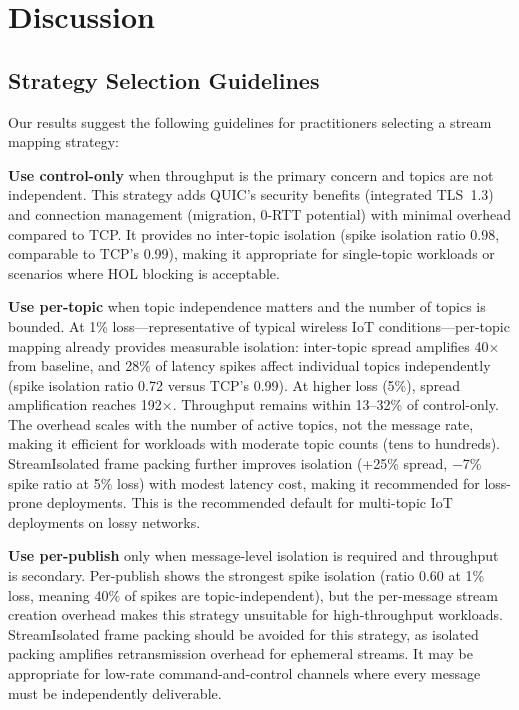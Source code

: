 \section{Discussion}
\label{sec:discussion}

\subsection{Strategy Selection Guidelines}

Our results suggest the following guidelines for practitioners selecting a stream mapping strategy:

\textbf{Use control-only} when throughput is the primary concern and topics are not independent. This strategy adds QUIC's security benefits (integrated TLS~1.3) and connection management (migration, 0-RTT potential) with minimal overhead compared to TCP. It provides no inter-topic isolation (spike isolation ratio 0.98, comparable to TCP's 0.99), making it appropriate for single-topic workloads or scenarios where HOL blocking is acceptable.

\textbf{Use per-topic} when topic independence matters and the number of topics is bounded. At 1\% loss---representative of typical wireless IoT conditions---per-topic mapping already provides measurable isolation: inter-topic spread amplifies 40$\times$ from baseline, and 28\% of latency spikes affect individual topics independently (spike isolation ratio 0.72 versus TCP's 0.99). At higher loss (5\%), spread amplification reaches 192$\times$. Throughput remains within 13--32\% of control-only. The overhead scales with the number of active topics, not the message rate, making it efficient for workloads with moderate topic counts (tens to hundreds). StreamIsolated frame packing further improves isolation (+25\% spread, $-$7\% spike ratio at 5\% loss) with modest latency cost, making it recommended for loss-prone deployments. This is the recommended default for multi-topic IoT deployments on lossy networks.

\textbf{Use per-publish} only when message-level isolation is required and throughput is secondary. Per-publish shows the strongest spike isolation (ratio 0.60 at 1\% loss, meaning 40\% of spikes are topic-independent), but the per-message stream creation overhead makes this strategy unsuitable for high-throughput workloads. StreamIsolated frame packing should be avoided for this strategy, as isolated packing amplifies retransmission overhead for ephemeral streams. It may be appropriate for low-rate command-and-control channels where every message must be independently deliverable.

